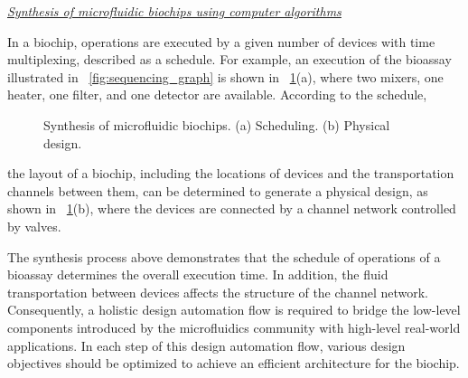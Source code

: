 \textit{\underline{Synthesis of microfluidic biochips  using
computer algorithms}}


In a biochip, 
operations are executed by a given number of devices with time
multiplexing,
described 
as
a schedule. For example, an execution %
of the bioassay
illustrated in \figname~\ref{fig:sequencing_graph} is shown 
in \figname~\ref{fig:biochip_synthesis}(a), 
where two mixers, one heater, one filter, and one detector are available.
According to the schedule, 


\begin{figure}
    {
    \vskip -3pt
    \figurefontsize
    \centering
    
    \caption{Synthesis of microfluidic biochips.
    (a) Scheduling. (b) Physical design.}
    \label{fig:biochip_synthesis}
    }
    \end{figure}

    the layout of a biochip, 
    including the locations of devices and the transportation channels between them,
    can be determined to generate a physical design, 
    as shown in \figname~\ref{fig:biochip_synthesis}(b), where the devices
    are connected by a channel network controlled by valves.
    
    The synthesis process above demonstrates that the schedule of operations of a
    bioassay determines the overall execution time. 
    In addition, the fluid transportation between devices 
    affects the structure of the channel network.
    Consequently, a holistic design automation flow is required to bridge the
    low-level components introduced by the microfluidics community with high-level
    real-world applications. In each step of this design automation flow, various design
    objectives should be optimized to achieve an efficient architecture for the
    biochip.
    
